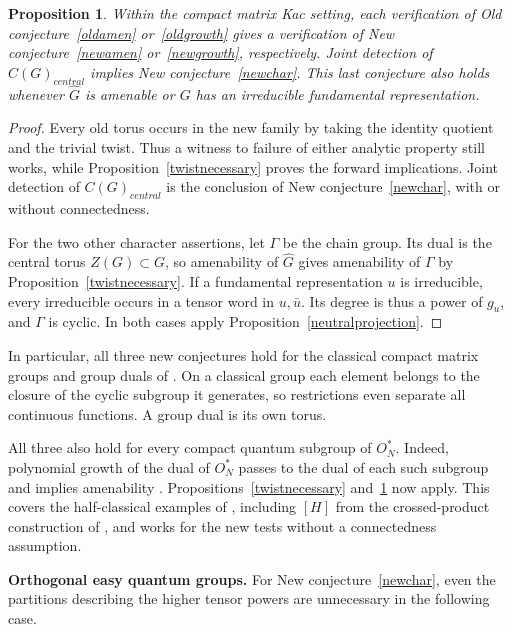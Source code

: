 \documentclass[11pt,a4paper]{article}
\newtheorem{prop}[thm]{Proposition}
\theoremstyle{remark}
\newcommand{\topic}[1]{\par\addvspace{1.0\baselineskip}\noindent\textbf{#1.}\enspace\ignorespaces}
\begin{document}
\begin{prop}\label{transfer}
Within the compact matrix Kac setting, each verification of Old
conjecture~\ref{oldamen} or~\ref{oldgrowth} gives a verification of
New conjecture~\ref{newamen} or~\ref{newgrowth}, respectively.
Joint detection of $C(G)_{central}$ implies New conjecture~\ref{newchar}.
This last conjecture also holds whenever $\widehat G$ is amenable or
$G$ has an irreducible fundamental representation.
\end{prop}
\begin{proof}
Every old torus occurs in the new family by taking the identity
quotient and the trivial twist. Thus a witness to failure of either
analytic property still works, while Proposition~\ref{twistnecessary}
proves the forward implications. Joint detection of $C(G)_{central}$ is the
conclusion of New conjecture~\ref{newchar}, with or without connectedness.

For the two other character assertions, let $\Gamma$ be the chain group.
Its dual is the central torus $Z(G)\subset G$, so amenability of
$\widehat G$ gives amenability of $\Gamma$ by
Proposition~\ref{twistnecessary}. If a fundamental representation $u$
is irreducible, every irreducible occurs in a tensor word in $u,\bar u$.
Its degree is thus a power of $g_u$, and $\Gamma$ is cyclic.
In both cases apply Proposition~\ref{neutralprojection}.
\end{proof}

In particular, all three new conjectures hold for the classical compact
matrix groups and group duals of \cite[Proposition~4.1]{bp}. On a
classical group each element belongs to the closure of the cyclic
subgroup it generates, so restrictions even separate all continuous
functions. A group dual is its own torus.

All three also hold for every compact quantum subgroup of $O_N^*$.
Indeed, polynomial growth of the dual of $O_N^*$ \cite[Section~9]{halforth}
passes to the dual of each such subgroup \cite[Proposition~4.1]{dpr}
and implies amenability \cite[Theorem~4.6]{dpr}.
Propositions~\ref{twistnecessary} and~\ref{transfer} now apply.
This covers the half-classical examples of \cite[Theorem~5.5]{bp},
including $[H]$ from the crossed-product construction of \cite{halfhopf},
and works for the new tests without a connectedness assumption.

\topic{Orthogonal easy quantum groups}
For New conjecture~\ref{newchar}, even the partitions describing the
higher tensor powers are unnecessary in the following case.
\end{document}
